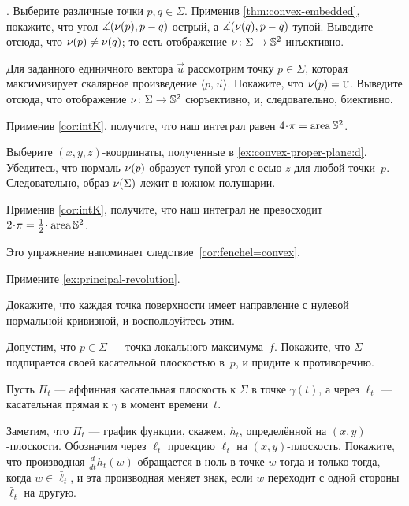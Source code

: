 \begin{multicols}{2}
\parbf{\ref{ex:intK}}.
Выберите различные точки $p,q\in\Sigma$.
Применив \ref{thm:convex-embedded}, покажите, что угол $\measuredangle(\Norm(p),p\z-q)$ острый, а $\measuredangle(\Norm(q),p\z-q)$ тупой.
Выведите отсюда, что $\nu(p)\ne\nu(q)$;
то есть отображение $\nu\colon\Sigma\to\mathbb{S}^2$ инъективно.

Для заданного единичного вектора $\vec u$ рассмотрим точку $p\in \Sigma$, которая максимизирует скалярное произведение $\langle p,\vec u\rangle$.
Покажите, что $\nu(p)=\text{\sc{u}}$.
Выведите отсюда, что отображение $\nu\colon\Sigma\to\mathbb{S}^2$ сюръективно, и, следовательно, биективно.

Применив \ref{cor:intK}, получите, что наш интеграл равен $4\cdot\pi=\area\mathbb{S}^2$.

Выберите $(x,y,z)$-координаты, полученные в \ref{ex:convex-proper-plane:d}.
Убедитесь, что нормаль $\nu(p)$ образует тупой угол с осью $z$ для любой точки~$p$.
Следовательно, образ $\nu(\Sigma)$ лежит в южном полушарии.

Применив \ref{cor:intK}, получите, что наш интеграл не превосходит $2\cdot\pi=\tfrac12\cdot\area\mathbb{S}^2$.

Это упражнение напоминает следствие~\ref{cor:fenchel=convex}.

\setcounter{eqtn}{0}

Примените \ref{ex:principal-revolution}.

Докажите, что каждая точка поверхности имеет направление с нулевой нормальной кривизной, и воспользуйтесь этим.

Допустим, что $p\in \Sigma$ --- точка локального максимума~$f$.
Покажите, что $\Sigma$ подпирается своей касательной плоскостью в~$p$,
и придите к противоречию.

Пусть $\Pi_t$ --- аффинная касательная плоскость к $\Sigma$ в точке $\gamma(t)$, а через $\ell_t$ --- касательная прямая к $\gamma$ в момент времени~$t$.

Заметим, что $\Pi_t$ --- график функции, скажем, $h_t$, определённой на $(x, y)$-плоскости.
Обозначим через $\bar\ell_t$ проекцию $\ell_t$ на $(x, y)$-плоскость.
Покажите, что производная $\tfrac{d}{dt}h_t(w)$ обращается в ноль в точке $w$ тогда и только тогда, когда $w\in \bar\ell_t$, и эта производная меняет знак, если $w$ переходит с одной стороны $\bar\ell_t$ на другую.


\end{multicols}
